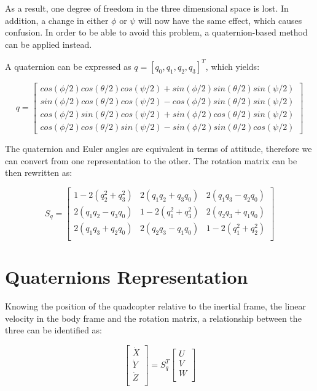As a result, one degree of freedom in the three dimensional space is lost. In addition, a change in either $\phi$ or $\psi$ will now have the same effect, which causes confusion. In order to be able to avoid this problem, a quaternion-based method can be applied instead. 

A quaternion can be expressed as $q=[q_{0}, q_{1}, q_{2}, q_{3}]^{T}$, which yields:

  \begin{equation}
\label{S4}
 q=\begin{bmatrix}
 	cos(\phi/2) cos(\theta/2) cos(\psi/2) + sin(\phi/2) sin(\theta/2) sin(\psi/2) \\
 	sin(\phi/2) cos(\theta/2) cos(\psi/2) - cos(\phi/2) sin(\theta/2) sin(\psi/2) \\
 	cos(\phi/2) sin(\theta/2) cos(\psi/2) + sin(\phi/2) cos(\theta/2) sin(\psi/2) \\
 	cos(\phi/2) cos(\theta/2) sin(\psi/2) - sin(\phi/2) sin(\theta/2) cos(\psi/2)
 	\end{bmatrix}
 	 \end{equation}
 	 
The quaternion and Euler angles are equivalent in terms of attitude, therefore we can convert from one representation to the other. The rotation matrix can be then rewritten as:

  \begin{equation}
\label{S5}
 S_{q}=\begin{bmatrix}
 	1-2(q_{2}^{2}+q_{3}^{2}) & 2(q_{1}q_{2}+q_{3}q_{0}) & 2(q_{1}q_{3}-q_{2}q_{0}) \\
 	2(q_{1}q_{2}-q_{3}q_{0}) & 1-2(q_{1}^{2}+q_{3}^{2}) & 2(q_{2}q_{3}+q_{1}q_{0})  \\
 	2(q_{1}q_{3}+q_{2}q_{0}) & 2(q_{2}q_{3}-q_{1}q_{0}) & 1-2(q_{1}^{2}+q_{2}^{2}) \\
 	\end{bmatrix}
 	 \end{equation}

\section{Quaternions Representation}
Knowing the position of the quadcopter relative to the inertial frame, the linear velocity in the body frame and the rotation matrix, a relationship between the three can be identified as:

  \begin{equation}
\label{S6}
 \begin{bmatrix}
 	\dot{X} \\
 	\dot{Y} \\
 	\dot{Z} \\
 	\end{bmatrix}=S_{q}^{T}\begin{bmatrix}
 	U \\
 	V \\
 	W \\
 	\end{bmatrix}
 	 \end{equation}
 	 
